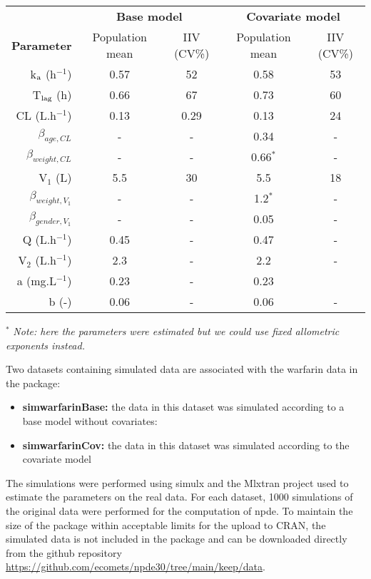 \begin{table}[!h]
\begin{center}
\begin{tabular}{r c c c c}
\hline 
& \multicolumn{2}{c}{\bf Base model} &  \multicolumn{2}{c}{\bf Covariate model} \\
{\bf Parameter} & Population mean & IIV (CV\%) & Population mean & IIV (CV\%) \\
\hline 
k$_{\rm a}$ (h$^{-1}$) & 0.57 & 52 & 0.58 & 53\\
T$_{\rm lag}$ (h) & 0.66 & 67 &  0.73 & 60\\
CL (L.h$^{-1}$) & 0.13 & 0.29 & 0.13 & 24 \\
$\beta_{age, CL}$ & - & - & 0.34 & -\\
$\beta_{weight, CL}$ & - & - & 0.66$^*$ & - \\
V$_1$ (L) & 5.5 & 30 & 5.5 & 18\\
$\beta_{weight, V_1}$ & - & - & 1.2$^*$ & -\\
$\beta_{gender, V_1}$ & - & - & 0.05 & - \\
Q (L.h$^{-1}$) & 0.45 & - & 0.47 & -\\
V$_2$ (L.h$^{-1}$) & 2.3 & - & 2.2 & - \\
a (mg.L$^{-1}$) & 0.23 & - & 0.23 \\
b (-) & 0.06 & - & 0.06 & -\\
\hline
\end{tabular}

$^*$ {\it Note: here the parameters were estimated but we could use fixed allometric exponents instead.}
\end{center}
\end{table}

Two datasets containing simulated data are associated with the {\sf warfarin} data in the package:
\begin{itemize}
\item {\bf simwarfarinBase:} the data in this dataset was simulated according to a base model without covariates:
\item {\bf simwarfarinCov:} the data in this dataset was simulated according to the covariate model
\end{itemize}
The simulations were performed using {\sf simulx} and the Mlxtran project used to estimate the parameters on the real data. For each dataset, 1000 simulations of the original data were performed for the computation of npde. To maintain the size of the package within acceptable limits for the upload to CRAN, the simulated data is not included in the package and can be downloaded directly from the github repository \url{https://github.com/ecomets/npde30/tree/main/keep/data}.


